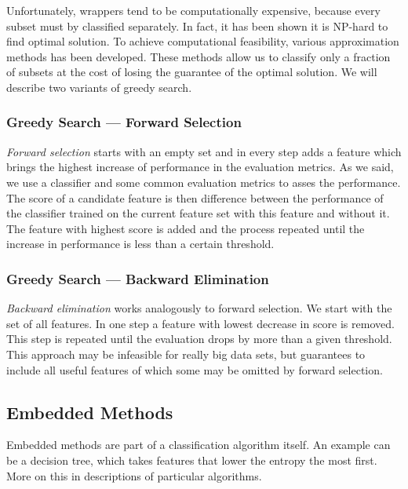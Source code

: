 Unfortunately, wrappers tend to be computationally expensive,
because every subset must by classified separately.
In fact, it has been shown it is NP-hard to find optimal solution.
To achieve computational feasibility, various approximation methods has been developed.
These methods allow us to classify only a fraction of subsets
at the cost of losing the guarantee of the optimal solution.
We will describe two variants of greedy search.


\subsubsection{Greedy Search --- Forward Selection}

{\it Forward selection} starts with an empty set and in every step adds a feature which brings the highest increase of performance in the evaluation metrics.
As we said, we use a classifier and some common evaluation metrics to asses the performance.
The score of a candidate feature is then difference between the performance of the classifier trained on the current feature set with this feature and without it.
The feature with highest score is added and the process repeated until the increase in performance is less than a certain threshold. 

\subsubsection{Greedy Search --- Backward Elimination}

{\it Backward elimination} works analogously to forward selection.
We start with the set of all features.
In one step a feature with lowest decrease in score is removed.
This step is repeated until the evaluation drops by more than a given threshold.
This approach may be infeasible for really big data sets, but guarantees to include all useful features of which some may be omitted by forward selection.

\subsection{Embedded Methods}

Embedded methods are part of a classification algorithm itself.
An example can be a decision tree, which takes features that lower the entropy the most first.
More on this in descriptions of particular algorithms.

